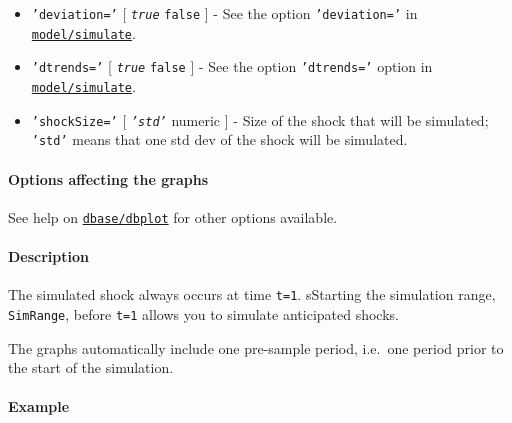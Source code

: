 \begin{itemize}
\item
  \texttt{'deviation='} {[} \emph{\texttt{true}} \textbar{}
  \texttt{false} {]} - See the option \texttt{'deviation='} in
  \href{model/simulate}{\texttt{model/simulate}}.
\item
  \texttt{'dtrends='} {[} \emph{\texttt{true}} \textbar{} \texttt{false}
  {]} - See the option \texttt{'dtrends='} option in
  \href{model/simulate}{\texttt{model/simulate}}.
\item
  \texttt{'shockSize='} {[} \emph{\texttt{'std'}} \textbar{} numeric {]}
  - Size of the shock that will be simulated; \texttt{'std'} means that
  one std dev of the shock will be simulated.
\end{itemize}

\paragraph{Options affecting the
graphs}\label{options-affecting-the-graphs}

See help on \href{dbase/dbplot}{\texttt{dbase/dbplot}} for other options
available.

\paragraph{Description}\label{description}

The simulated shock always occurs at time \texttt{t=1}. sStarting the
simulation range, \texttt{SimRange}, before \texttt{t=1} allows you to
simulate anticipated shocks.

The graphs automatically include one pre-sample period, i.e.~one period
prior to the start of the simulation.

\paragraph{Example}\label{example}


